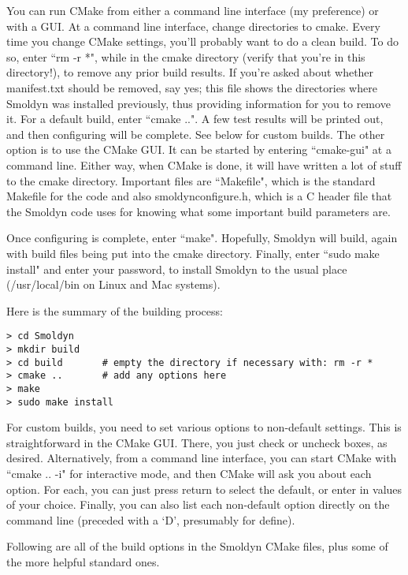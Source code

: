 \documentclass {book}
\begin{document}
You can run CMake from either a command line interface (my preference) or with a GUI. At a command line interface, change directories to cmake. Every time you change CMake settings, you'll probably want to do a clean build. To do so, enter ``rm -r *", while in the cmake directory (verify that you're in this directory!), to remove any prior build results. If you're asked about whether manifest.txt should be removed, say yes; this file shows the directories where Smoldyn was installed previously, thus providing information for you to remove it. For a default build, enter ``cmake ..". A few test results will be printed out, and then configuring will be complete. See below for custom builds. The other option is to use the CMake GUI. It can be started by entering ``cmake-gui" at a command line. Either way, when CMake is done, it will have written a lot of stuff to the cmake directory. Important files are ``Makefile", which is the standard Makefile for the code and also smoldynconfigure.h, which is a C header file that the Smoldyn code uses for knowing what some important build parameters are.

Once configuring is complete, enter ``make". Hopefully, Smoldyn will build, again with build files being put into the cmake directory. Finally, enter ``sudo make install" and enter your password, to install Smoldyn to the usual place (/usr/local/bin on Linux and Mac systems).

Here is the summary of the building process:

\begin{lstlisting}
> cd Smoldyn
> mkdir build
> cd build       # empty the directory if necessary with: rm -r *
> cmake ..	     # add any options here
> make
> sudo make install
\end{lstlisting}

For custom builds, you need to set various options to non-default settings. This is straightforward in the CMake GUI. There, you just check or uncheck boxes, as desired. Alternatively, from a command line interface, you can start CMake with ``cmake .. -i" for interactive mode, and then CMake will ask you about each option. For each, you can just press return to select the default, or enter in values of your choice. Finally, you can also list each non-default option directly on the command line (preceded with a `D', presumably for define).

Following are all of the build options in the Smoldyn CMake files, plus some of the more helpful standard ones.
\end{document}
